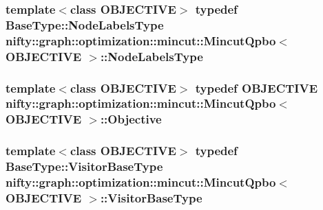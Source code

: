 \subsubsection[{Node\+Labels\+Type}]{\setlength{\rightskip}{0pt plus 5cm}template$<$class O\+B\+J\+E\+C\+T\+I\+V\+E$>$ typedef {\bf Base\+Type\+::\+Node\+Labels\+Type} {\bf nifty\+::graph\+::optimization\+::mincut\+::\+Mincut\+Qpbo}$<$ O\+B\+J\+E\+C\+T\+I\+V\+E $>$\+::{\bf Node\+Labels\+Type}}\label{classnifty_1_1graph_1_1optimization_1_1mincut_1_1MincutQpbo_aac9ec9c574aa36724795a7596e887834}
\hypertarget{classnifty_1_1graph_1_1optimization_1_1mincut_1_1MincutQpbo_ad5d16b8f42da9e1330dbd9cc9b0435aa}{}
\subsubsection[{Objective}]{\setlength{\rightskip}{0pt plus 5cm}template$<$class O\+B\+J\+E\+C\+T\+I\+V\+E$>$ typedef O\+B\+J\+E\+C\+T\+I\+V\+E {\bf nifty\+::graph\+::optimization\+::mincut\+::\+Mincut\+Qpbo}$<$ O\+B\+J\+E\+C\+T\+I\+V\+E $>$\+::{\bf Objective}}\label{classnifty_1_1graph_1_1optimization_1_1mincut_1_1MincutQpbo_ad5d16b8f42da9e1330dbd9cc9b0435aa}
\hypertarget{classnifty_1_1graph_1_1optimization_1_1mincut_1_1MincutQpbo_aba6eaaa013ca021676e82152a22e7d55}{}
\subsubsection[{Visitor\+Base\+Type}]{\setlength{\rightskip}{0pt plus 5cm}template$<$class O\+B\+J\+E\+C\+T\+I\+V\+E$>$ typedef {\bf Base\+Type\+::\+Visitor\+Base\+Type} {\bf nifty\+::graph\+::optimization\+::mincut\+::\+Mincut\+Qpbo}$<$ O\+B\+J\+E\+C\+T\+I\+V\+E $>$\+::{\bf Visitor\+Base\+Type}}\label{classnifty_1_1graph_1_1optimization_1_1mincut_1_1MincutQpbo_aba6eaaa013ca021676e82152a22e7d55}
\hypertarget{classnifty_1_1graph_1_1optimization_1_1mincut_1_1MincutQpbo_a1675bc1767efc807ca32b1e7b74133f1}{}
